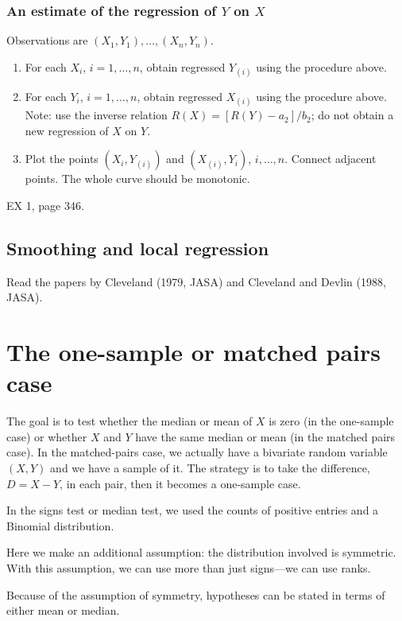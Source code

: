 \documentclass[12pt]{article}
\begin{document}
\subsubsection{An estimate of the regression of $Y$ on $X$}

Observations are $(X_1,Y_1),\dotsc, (X_n,Y_n)$.

\begin{enumerate}
\item For each $X_i$, $i=1,\dotsc,n$, obtain regressed $Y_{(i)}$ using
the procedure above.
\item For each $Y_i$, $i=1,\dotsc,n$, obtain regressed $X_{(i)}$ using
the procedure above. Note: use the inverse relation
$R(X) = [R(Y) - a_2]/b_2$; do not obtain a new regression of $X$ on $Y$.
\item Plot the points $(X_i, Y_{(i)})$ and $(X_{(i)}, Y_i)$,
$i,\dotsc,n$. Connect adjacent points. The whole curve should be
monotonic.
\end{enumerate}

\example EX 1, page 346.

\subsection{Smoothing and local regression}

Read the papers by Cleveland (1979, JASA) and
Cleveland and Devlin (1988, JASA).

\section{The one-sample or matched pairs case}

The goal is to test whether
the median or mean of $X$ is zero (in the one-sample case) or
whether $X$ and $Y$ have the same median or mean (in the matched pairs
case).
In the matched-pairs case, we actually have a bivariate random variable
$(X, Y)$ and we have a sample of it.
The strategy is to take the difference,
$D = X-Y$, in each pair, then it becomes a one-sample case.

In the signs test or median test,
we used the counts of positive entries and a Binomial distribution.

Here we make an additional assumption: the distribution involved is
symmetric. With this assumption, we can use more than just signs---we
can use ranks.

Because of the assumption of symmetry,
hypotheses can be stated in terms of either mean or median.
\end{document}
